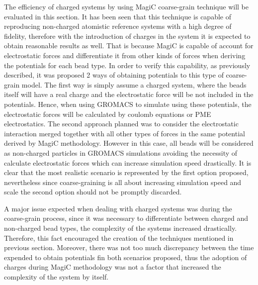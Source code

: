 \documentclass[10pt,a4paper,twoside]{article}
\begin{document}
The efficiency of charged systems by using MagiC coarse-grain technique will be evaluated in this section. It has been seen that this technique is capable of reproducing non-charged atomistic reference systems with a high degree of fidelity, therefore with the introduction of charges in the system it is expected  to obtain reasonable results as well. That is because MagiC is capable of account for electrostatic forces and differentiate it from other kinds of forces when deriving the potentials for each bead type. In order to verify this capability, as previously described, it was proposed 2 ways of obtaining potentials to this type of coarse-grain model. The first way is simply assume a charged system, where the beads itself will have a real charge and the electrostatic force will be not included in the potentials. Hence, when using GROMACS to simulate using these potentials, the electrostatic forces will be calculated by coulomb equations or PME electrostatics. The second approach planned was to consider the electrostatic interaction merged together with all other types of forces in the same potential derived by MagiC methodology. However in this case, all beads will be considered as non-charged particles in GROMACS simulations avoiding the necessity of calculate electrostatic forces which can increase simulation speed drastically. It is clear that the most realistic scenario is represented by the first option proposed, nevertheless since coarse-graining is all about increasing simulation speed and scale the second option should not be promptly discarded.

A major issue expected when dealing with charged systems was during the coarse-grain process, since it was necessary to differentiate between charged and non-charged bead types, the complexity of the systems increased drastically. Therefore, this fact encouraged the creation of the techniques mentioned in previous section. Moreover, there was not too much discrepancy between the time expended to obtain potentials fin both scenarios proposed, thus the adoption of charges during MagiC methodology was not a factor that increased the complexity of the system by itself.
\end{document}
